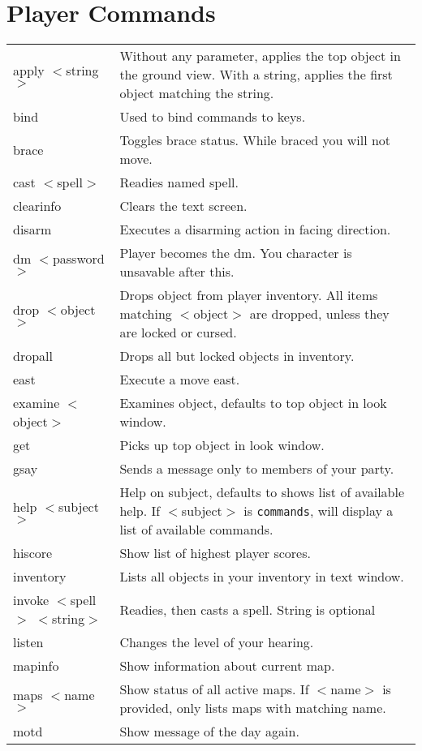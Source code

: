 \chapter{Player Commands}
\label{app:commands}
{\scriptsize
\begin{longtable}{p{4cm}p{9cm}}
apply $<$string$>$ & Without any parameter, applies the top object in the ground view. With a string, applies the first object matching the string. \\ 
bind & Used to bind commands to keys. \\ 
brace & Toggles brace status. While braced you will not move. \\ 
cast $<$spell$>$ & Readies named spell. \\ 
clearinfo & Clears the text screen. \\ 
disarm & Executes a disarming action in facing direction. \\ 
dm $<$password$>$ & Player becomes the dm. You character is unsavable after this. \\ 
drop $<$object$>$ & Drops object from player inventory. All items matching $<$object$>$ are dropped, unless they are locked or cursed. \\ 
dropall &  Drops all but locked objects in inventory. \\ 
east & Execute a move east. \\ 
examine $<$object$>$ & Examines object, defaults to top object in look window. \\ 
get & Picks up top object in look window. \\ 
gsay & Sends a message only to members of your party.\\ 
help $<$subject$>$ & Help on subject, defaults to shows list of available help. If $<$subject$>$ is {\tt commands}, will display a list of available commands. \\
hiscore & Show list of highest player scores. \\ 
inventory & Lists all objects in your inventory in text window. \\ 
invoke $<$spell$>$ $<$string$>$ & Readies, then casts a spell. String is optional \\
listen & Changes the level of your hearing. \\ 
mapinfo & Show information about current map. \\ 
maps $<$name$>$ & Show status of all active maps. If $<$name$>$ is provided, only lists maps with matching name. \\
motd & Show message of the day again. \\ 

\end{longtable}}
